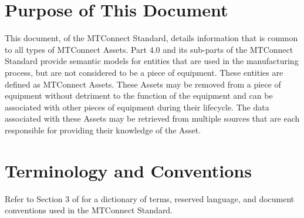 \section{Purpose of This Document}

This document,  of the MTConnect Standard, details information that is common to all types of \glspl{MTConnect Asset}.  Part 4.0 and its sub-parts of the MTConnect Standard provide semantic models for entities that are used in the manufacturing process, but are not considered to be a piece of equipment.  These entities are defined as \glspl{MTConnect Asset}.  These \glspl{Asset} may be removed from a piece of equipment without detriment to the function of the equipment and can be associated with other pieces of equipment during their lifecycle.  The data associated with these \glspl{Asset} may be retrieved from multiple sources that are each responsible for providing their knowledge of the \gls{Asset}.

\section{Terminology and Conventions}
Refer to Section 3 of  for a dictionary of terms, reserved language, and document conventions used in the MTConnect Standard.

\printglossary

\printacronyms

\printbibliography[title=MTConnect References,keyword=MTC]

\printbibliography[title=Other References,notkeyword=MTC]
